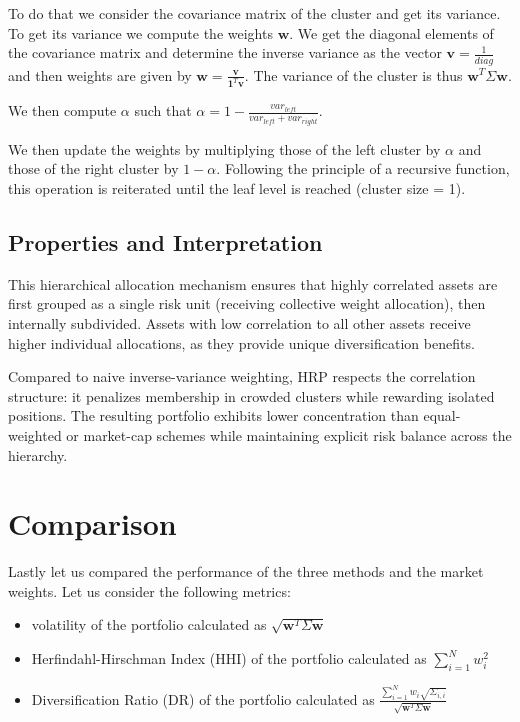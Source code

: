 \documentclass[11pt,a4paper]{article}
\begin{document}
To do that we consider the covariance matrix of the cluster and get its variance. To get its variance we compute the weights $\mathbf{w}$. 
We get the diagonal elements of the covariance matrix and determine the inverse variance as the vector $\mathbf{v} = \frac{1}{diag}$ and then weights are given by
$\mathbf{w} = \frac{\mathbf{v}}{\mathbf{1}^T \mathbf{v}}$. The variance of the cluster is thus $\mathbf{w}^T \Sigma \mathbf{w}$.

We then compute $\alpha$ such that $\alpha = 1 - \frac{var_{left}}{var_{left} + var_{right}}$.

We then update the weights by multiplying those of the left cluster by $\alpha$ and those of the right cluster by $1 - \alpha$.
Following the principle of a recursive function, this operation is reiterated until the leaf level is reached (cluster size = 1).

\subsection{Properties and Interpretation}
This hierarchical allocation mechanism ensures that highly correlated assets are first grouped as a single risk unit (receiving collective weight allocation), then internally subdivided. Assets with low correlation to all other assets receive higher individual allocations, as they provide unique diversification benefits.

Compared to naive inverse-variance weighting, HRP respects the correlation structure: it penalizes membership in crowded clusters while rewarding isolated positions. The resulting portfolio exhibits lower concentration than equal-weighted or market-cap schemes while maintaining explicit risk balance across the hierarchy.

\section{Comparison}
Lastly let us compared the performance of the three methods and the market weights.
Let us consider the following metrics:
\begin{itemize}
    \item volatility of the portfolio calculated as $\sqrt{\mathbf{w}^T \Sigma \mathbf{w}}$
    \item Herfindahl-Hirschman Index (HHI) of the portfolio calculated as $\sum_{i=1}^N w_i^2$
    \item Diversification Ratio (DR) of the portfolio calculated as $\frac{\sum_{i=1}^N w_i \sqrt{\Sigma_{i,i}}}{\sqrt{\mathbf{w}^T \Sigma \mathbf{w}}}$
\end{itemize}
\end{document}
